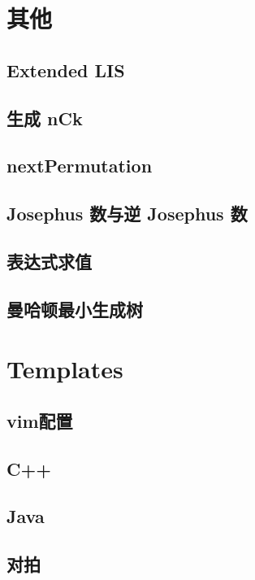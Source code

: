 \documentclass[10pt, a4paper]{article}
\begin{document}
  
\section{其他}
  \subsection{Extended LIS}
    

  \subsection{生成 nCk}
    

  \subsection{nextPermutation}
    

  \subsection{Josephus 数与逆 Josephus 数}
    
  
  \subsection{表达式求值}
    

  \subsection{曼哈顿最小生成树}
    

\section{Templates}
  \subsection{vim配置}
    
  \subsection{C++}
    
  \subsection{Java}
    
  \subsection{对拍}
    
\end{document}
